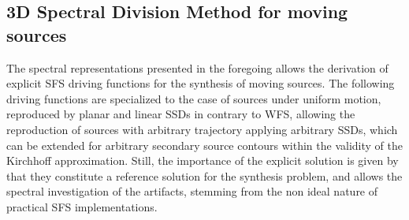 \subsection{3D Spectral Division Method for moving sources}
The spectral representations presented in the foregoing allows the derivation of explicit SFS driving functions for the synthesis of moving sources.
The following driving functions are specialized to the case of sources under uniform motion, reproduced by planar and linear SSDs in contrary to WFS, allowing the reproduction of sources with arbitrary trajectory applying arbitrary SSDs, which can be extended for arbitrary secondary source contours within the validity of the Kirchhoff approximation.
Still, the importance of the explicit solution is given by that they constitute a reference solution for the synthesis problem, and allows the spectral investigation of the artifacts, stemming from the non ideal nature of practical SFS implementations.

